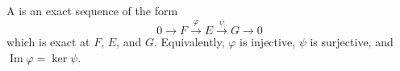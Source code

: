 A  is an exact sequence of the form
$$
0 \longrightarrow F \xrightarrow{\varphi} E \xrightarrow{\psi} G \longrightarrow 0
$$
which is exact at $F$, $E$, and $G$. Equivalently, $\varphi$ is injective, $\psi$ is surjective, and $\operatorname{Im} \varphi = \ker \psi$.
